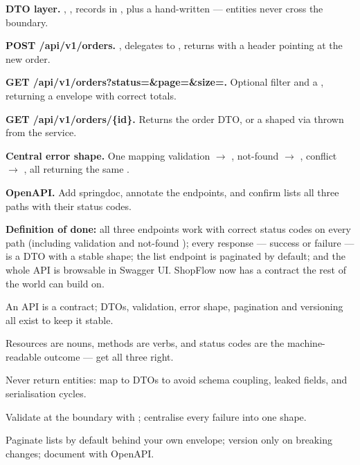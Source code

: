 \begin{buildalong}
\begin{wbitem}
  \item \textbf{DTO layer.} , ,  records in , plus a hand-written  --- entities never cross the boundary.
  \item \textbf{POST /api/v1/orders.} , delegates to , returns  with a  header pointing at the new order.
  \item \textbf{GET /api/v1/orders?status=\&page=\&size=.} Optional  filter and a , returning a  envelope with correct totals.
  \item \textbf{GET /api/v1/orders/\{id\}.} Returns the order DTO, or a shaped  via  thrown from the service.
  \item \textbf{Central error shape.} One  mapping validation $\rightarrow$ , not-found $\rightarrow$ , conflict $\rightarrow$ , all returning the same .
  \item \textbf{OpenAPI.} Add springdoc, annotate the endpoints, and confirm  lists all three paths with their status codes.
\end{wbitem}
\smallskip\textbf{Definition of done:} all three endpoints work with correct status codes on every path (including validation  and not-found ); every response --- success or failure --- is a DTO with a stable shape; the list endpoint is paginated by default; and the whole API is browsable in Swagger UI. ShopFlow now has a contract the rest of the world can build on.
\end{buildalong}


\begin{tickcheck}
  \item An API is a contract; DTOs, validation, error shape, pagination and versioning all exist to keep it stable.
  \item Resources are nouns, methods are verbs, and status codes are the machine-readable outcome --- get all three right.
  \item Never return entities: map to DTOs to avoid schema coupling, leaked fields, and serialisation cycles.
  \item Validate at the boundary with ; centralise every failure into one  shape.
  \item Paginate lists by default behind your own envelope; version only on breaking changes; document with OpenAPI.
\end{tickcheck}

